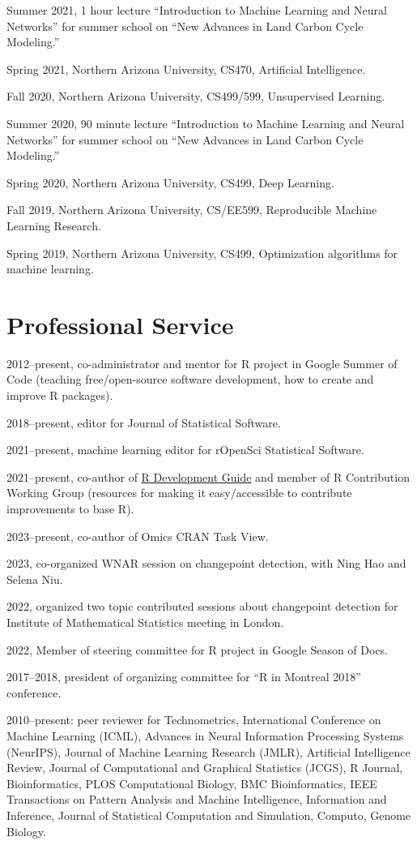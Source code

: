 \documentclass[margin,line]{res}
\begin{document}
\begin{resume}
Summer 2021, 1 hour lecture ``Introduction to Machine Learning and
Neural Networks'' for summer school on ``New Advances in Land Carbon
Cycle Modeling.''

Spring 2021, Northern Arizona University, CS470, Artificial Intelligence.

Fall 2020, Northern Arizona University, CS499/599, Unsupervised
Learning.

Summer 2020, 90 minute lecture ``Introduction to Machine Learning and
Neural Networks'' for summer school on ``New Advances in Land Carbon
Cycle Modeling.''

Spring 2020, Northern Arizona University, CS499, Deep Learning.

Fall 2019, Northern Arizona University, CS/EE599, Reproducible Machine
Learning Research.

Spring 2019, Northern Arizona University, CS499, Optimization
algorithms for machine learning.

\section{\sc Professional Service}

2012--present, co-administrator and mentor for R project in Google
Summer of Code (teaching free/open-source software development, how to
create and improve R packages).

2018--present, editor for Journal of Statistical Software.

2021--present, machine learning editor for rOpenSci Statistical Software.

2021--present, co-author of
\href{https://contributor.r-project.org/rdevguide/}{R Development
  Guide} and member of R Contribution Working Group (resources for
making it easy/accessible to contribute improvements to base R).

2023--present, co-author of Omics CRAN Task View.

2023, co-organized WNAR session on changepoint detection, with Ning
Hao and Selena Niu.

2022, organized two topic contributed sessions about changepoint
detection for Institute of Mathematical Statistics meeting in London.

2022, Member of steering committee for R project in Google Season of Docs.

2017--2018, president of organizing committee for ``R in Montreal
2018'' conference.

2010--present: peer reviewer for Technometrics, International
Conference on Machine Learning (ICML), Advances in Neural Information
Processing Systems (NeurIPS), Journal of Machine Learning Research
(JMLR), Artificial Intelligence Review, Journal of Computational and
Graphical Statistics (JCGS), R Journal, Bioinformatics, PLOS
Computational Biology, BMC Bioinformatics, IEEE Transactions on
Pattern Analysis and Machine Intelligence, Information and Inference,
Journal of Statistical Computation and Simulation, Computo, Genome
Biology.


\end{resume}
\end{document}
